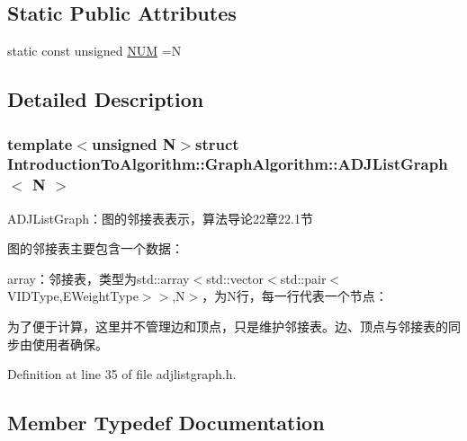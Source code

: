 \subsection*{Static Public Attributes}
\begin{DoxyCompactItemize}
\item 
static const unsigned \hyperlink{struct_introduction_to_algorithm_1_1_graph_algorithm_1_1_a_d_j_list_graph_aaff3f1cdb9f184027dd3f057d4a5b4bc}{N\+U\+M} =N
\end{DoxyCompactItemize}


\subsection{Detailed Description}
\subsubsection*{template$<$unsigned N$>$struct Introduction\+To\+Algorithm\+::\+Graph\+Algorithm\+::\+A\+D\+J\+List\+Graph$<$ N $>$}

A\+D\+J\+List\+Graph：图的邻接表表示，算法导论22章22.1节 

图的邻接表主要包含一个数据：


\begin{DoxyItemize}
\item {\ttfamily array}：邻接表，类型为{\ttfamily std\+::array$<$std\+::vector$<$std\+::pair$<$V\+I\+D\+Type,E\+Weight\+Type$>$$>$,N$>$}，为{\ttfamily N}行，每一行代表一个节点：
\end{DoxyItemize}

为了便于计算，这里并不管理边和顶点，只是维护邻接表。边、顶点与邻接表的同步由使用者确保。 

Definition at line 35 of file adjlistgraph.\+h.



\subsection{Member Typedef Documentation}
\hypertarget{struct_introduction_to_algorithm_1_1_graph_algorithm_1_1_a_d_j_list_graph_a6757574602df8359b10e37079c789eb6}{}
